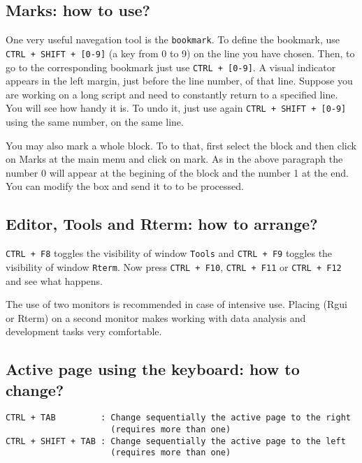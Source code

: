\subsection{Marks: how to use?}

One very useful navegation tool is the \texttt{bookmark}. To define the bookmark,
use \texttt{CTRL + SHIFT + [0-9]} (a key from 0 to 9) on the line you have chosen.
Then, to go to the corresponding bookmark just use \texttt{CTRL + [0-9]}.
A visual indicator appears in the left margin, just before the line number, of that line.
Suppose you are working on a long script and need to constantly return to a specified line.
You will see how handy it is. To undo it, just use again \texttt{CTRL + SHIFT + [0-9]} using the same number, on the same line.

You may also mark a whole block. To to that, first select the block and then click on Marks at the main menu and click on mark.
As in the above paragraph the number 0 will appear at the begining of the block and the number 1 at the end.
You can modify the box and send it to \RR{} to be processed.

\subsection{Editor, Tools and Rterm: how to arrange?}

\texttt{CTRL + F8} toggles the visibility of window \texttt{Tools} and \texttt{CTRL + F9}
toggles the visibility of window \texttt{Rterm}. Now press \texttt{CTRL + F10},
\texttt{CTRL + F11} or \texttt{CTRL + F12} and see what happens.

The use of two monitors is recommended in case of intensive use.
Placing \RR{} (Rgui or Rterm) on a second monitor makes working with data analysis and development tasks very comfortable.

\subsection{Active page using the keyboard: how to change?}

\begin{verbatim}
CTRL + TAB         : Change sequentially the active page to the right
                     (requires more than one)
CTRL + SHIFT + TAB : Change sequentially the active page to the left
                     (requires more than one)
\end{verbatim}

